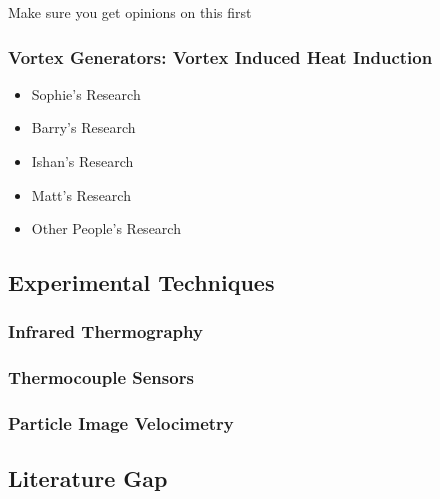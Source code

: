 Make sure you get opinions on this first\par

\subsubsection{Vortex Generators: Vortex Induced Heat Induction} %
\begin{itemize}
    \item Sophie's Research
    \item Barry's Research
    \item Ishan's Research
    \item Matt's Research
    \item Other People's Research
\end{itemize}

\pagebreak
\subsection{Experimental Techniques}
\subsubsection{Infrared Thermography}
\subsubsection{Thermocouple Sensors}
\subsubsection{Particle Image Velocimetry}

\pagebreak
\subsection{Literature Gap}

\pagebreak


